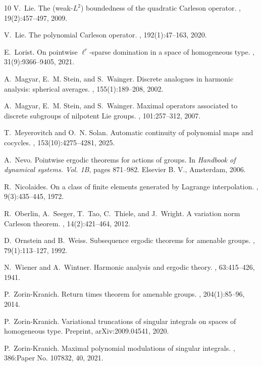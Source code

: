 \documentclass[12pt,reqno,a4paper,dvipsnames]{amsart}
\theoremstyle{plain}
\theoremstyle{definition}
\numberwithin{theorem}{section}
\numberwithin{equation}{section}
\begin{document}
\begin{thebibliography}{10}
V.~Lie.
\newblock The (weak-{$L^2$}) boundedness of the quadratic {C}arleson operator.
, 19(2):457--497, 2009.

V.~Lie.
\newblock The polynomial {C}arleson operator.
, 192(1):47--163, 2020.

E.~Lorist.
\newblock On pointwise {$\ell^r$}-sparse domination in a space of homogeneous type.
, 31(9):9366--9405, 2021.

A.~Magyar, E.~M. Stein, and S.~Wainger.
\newblock Discrete analogues in harmonic analysis: spherical averages.
, 155(1):189--208, 2002.

A.~Magyar, E.~M. Stein, and S.~Wainger.
\newblock Maximal operators associated to discrete subgroups of nilpotent {L}ie groups.
, 101:257--312, 2007.

T.~Meyerovitch and O.~N. Solan.
\newblock Automatic continuity of polynomial maps and cocycles.
, 153(10):4275--4281, 2025.

A.~Nevo.
\newblock Pointwise ergodic theorems for actions of groups.
\newblock In {\em Handbook of dynamical systems. {V}ol. 1{B}}, pages 871--982. Elsevier B. V., Amsterdam, 2006.

R.~Nicolaides.
\newblock On a class of finite elements generated by {L}agrange interpolation.
, 9(3):435--445, 1972.

R.~Oberlin, A.~Seeger, T.~Tao, C.~Thiele, and J.~Wright.
\newblock A variation norm {C}arleson theorem.
, 14(2):421--464, 2012.

D.~Ornstein and B.~Weiss.
\newblock Subsequence ergodic theorems for amenable groups.
, 79(1):113--127, 1992.

N.~Wiener and A.~Wintner.
\newblock Harmonic analysis and ergodic theory.
, 63:415--426, 1941.

P.~Zorin-Kranich.
\newblock Return times theorem for amenable groups.
, 204(1):85--96, 2014.

P.~Zorin-Kranich.
\newblock Variational truncations of singular integrals on spaces of homogeneous type.
\newblock Preprint, {arXiv}:2009.04541, 2020.

P.~Zorin-Kranich.
\newblock Maximal polynomial modulations of singular integrals.
, 386:Paper No. 107832, 40, 2021.

\end{thebibliography}
\end{document}
